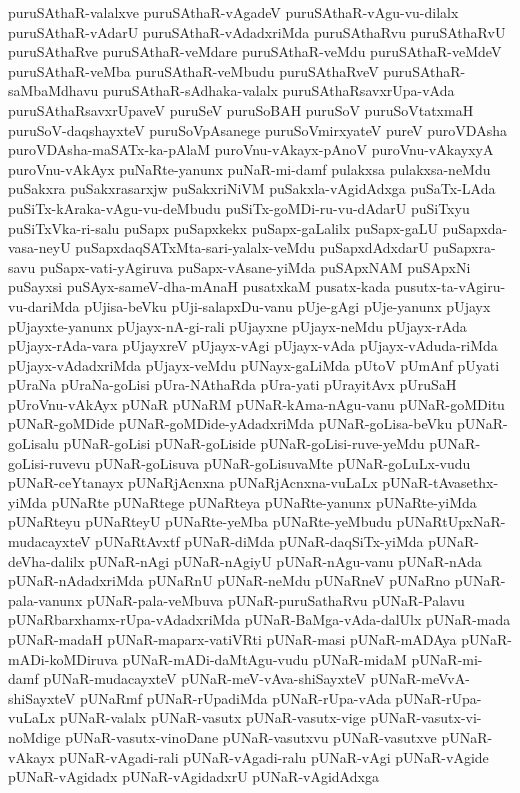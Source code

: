 {puruSAthaR-valalxve
puruSAthaR-vAgadeV
puruSAthaR-vAgu-vu-dilalx
puruSAthaR-vAdarU
puruSAthaR-vAdadxriMda
puruSAthaRvu
puruSAthaRvU
puruSAthaRve
puruSAthaR-veMdare
puruSAthaR-veMdu
puruSAthaR-veMdeV
puruSAthaR-veMba
puruSAthaR-veMbudu
puruSAthaRveV
puruSAthaR-saMbaMdhavu
puruSAthaR-sAdhaka-valalx
puruSAthaRsavxrUpa-vAda
puruSAthaRsavxrUpaveV
puruSeV
puruSoBAH
puruSoV
puruSoVtatxmaH
puruSoV-daqshayxteV
puruSoVpAsanege
puruSoVmirxyateV
pureV
puroVDAsha
puroVDAsha-maSATx-ka-pAlaM
puroVnu-vAkayx-pAnoV
puroVnu-vAkayxyA
puroVnu-vAkAyx
puNaRte-yanunx
puNaR-mi-damf
pulakxsa
pulakxsa-neMdu
puSakxra
puSakxrasarxjw
puSakxriNiVM
puSakxla-vAgidAdxga
puSaTx-LAda
puSiTx-kAraka-vAgu-vu-deMbudu
puSiTx-goMDi-ru-vu-dAdarU
puSiTxyu
puSiTxVka-ri-salu
puSapx
puSapxkekx
puSapx-gaLalilx
puSapx-gaLU
puSapxda-vasa-neyU
puSapxdaqSATxMta-sari-yalalx-veMdu
puSapxdAdxdarU
puSapxra-savu
puSapx-vati-yAgiruva
puSapx-vAsane-yiMda
puSApxNAM
puSApxNi
puSayxsi
puSAyx-sameV-dha-mAnaH
pusatxkaM
pusatx-kada
pusutx-ta-vAgiru-vu-dariMda
pUjisa-beVku
pUji-salapxDu-vanu
pUje-gAgi
pUje-yanunx
pUjayx
pUjayxte-yanunx
pUjayx-nA-gi-rali
pUjayxne
pUjayx-neMdu
pUjayx-rAda
pUjayx-rAda-vara
pUjayxreV
pUjayx-vAgi
pUjayx-vAda
pUjayx-vAduda-riMda
pUjayx-vAdadxriMda
pUjayx-veMdu
pUNayx-gaLiMda
pUtoV
pUmAnf
pUyati
pUraNa
pUraNa-goLisi
pUra-NAthaRda
pUra-yati
pUrayitAvx
pUruSaH
pUroVnu-vAkAyx
pUNaR
pUNaRM
pUNaR-kAma-nAgu-vanu
pUNaR-goMDitu
pUNaR-goMDide
pUNaR-goMDide-yAdadxriMda
pUNaR-goLisa-beVku
pUNaR-goLisalu
pUNaR-goLisi
pUNaR-goLiside
pUNaR-goLisi-ruve-yeMdu
pUNaR-goLisi-ruvevu
pUNaR-goLisuva
pUNaR-goLisuvaMte
pUNaR-goLuLx-vudu
pUNaR-ceYtanayx
pUNaRjAcnxna
pUNaRjAcnxna-vuLaLx
pUNaR-tAvasethx-yiMda
pUNaRte
pUNaRtege
pUNaRteya
pUNaRte-yanunx
pUNaRte-yiMda
pUNaRteyu
pUNaRteyU
pUNaRte-yeMba
pUNaRte-yeMbudu
pUNaRtUpxNaR-mudacayxteV
pUNaRtAvxtf
pUNaR-diMda
pUNaR-daqSiTx-yiMda
pUNaR-deVha-dalilx
pUNaR-nAgi
pUNaR-nAgiyU
pUNaR-nAgu-vanu
pUNaR-nAda
pUNaR-nAdadxriMda
pUNaRnU
pUNaR-neMdu
pUNaRneV
pUNaRno
pUNaR-pala-vanunx
pUNaR-pala-veMbuva
pUNaR-puruSathaRvu
pUNaR-Palavu
pUNaRbarxhamx-rUpa-vAdadxriMda
pUNaR-BaMga-vAda-dalUlx
pUNaR-mada
pUNaR-madaH
pUNaR-maparx-vatiVRti
pUNaR-masi
pUNaR-mADAya
pUNaR-mADi-koMDiruva
pUNaR-mADi-daMtAgu-vudu
pUNaR-midaM
pUNaR-mi-damf
pUNaR-mudacayxteV
pUNaR-meV-vAva-shiSayxteV
pUNaR-meVvA-shiSayxteV
pUNaRmf
pUNaR-rUpadiMda
pUNaR-rUpa-vAda
pUNaR-rUpa-vuLaLx
pUNaR-valalx
pUNaR-vasutx
pUNaR-vasutx-vige
pUNaR-vasutx-vi-noMdige
pUNaR-vasutx-vinoDane
pUNaR-vasutxvu
pUNaR-vasutxve
pUNaR-vAkayx
pUNaR-vAgadi-rali
pUNaR-vAgadi-ralu
pUNaR-vAgi
pUNaR-vAgide
pUNaR-vAgidadx
pUNaR-vAgidadxrU
pUNaR-vAgidAdxga
}
